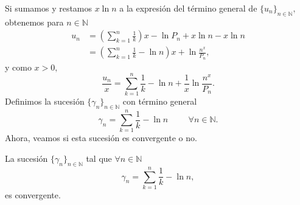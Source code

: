 Si sumamos y restamos $x\ln n$ a la expresión del término general de $\{u_n\}_{n \in \mathbb{N}},$ obtenemos para $n \in \mathbb{N}$
\begin{align*}
u_n &= \left(\sum_{k = 1}^{n}\frac{1}{k}\right)x-\ln P_n+x\ln n-x\ln n\\
&= \left(\sum_{k = 1}^{n}\frac{1}{k}-\ln n\right)x+\ln \frac{n^x}{P_n},
\end{align*}
y como $x > 0,$
\begin{equation}
\frac{u_n}{x} = \sum_{k = 1}^{n}\frac{1}{k}-\ln n+\frac{1}{x}\ln \frac{n^x}{P_n}.
\end{equation}
Definimos la sucesión $\{\gamma_n\}_{n \in \mathbb{N}}$ con término general $$\gamma_n = \sum_{k = 1}^{n}\frac{1}{k}-\ln n\hspace{1cm}\forall n \in \mathbb{N}.$$ Ahora, veamos si esta sucesión es convergente o no.
\begin{proposition}
	La sucesión $\{\gamma_n\}_{n \in \mathbb{N}}$ tal que $\forall n \in \mathbb{N}$ $$\gamma_n = \sum_{k = 1}^{n}\frac{1}{k}-\ln n,$$ es convergente.
\end{proposition}
